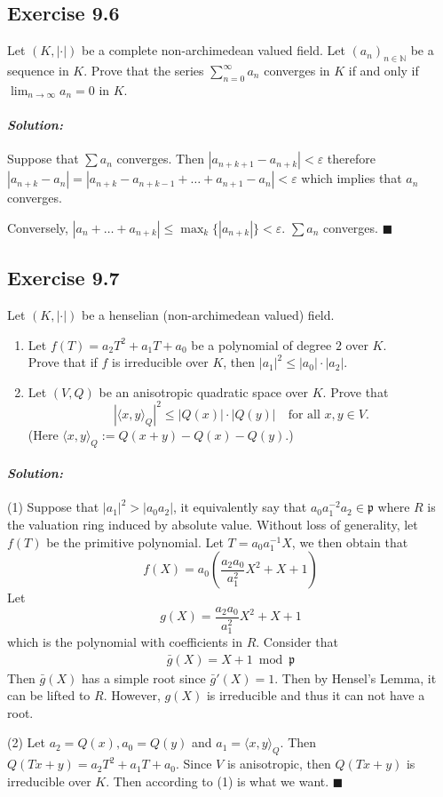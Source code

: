 \documentclass[12pt, a4paper]{article}
\newcommand{\p}{\mathfrak{p}}
\newenvironment{solution}
  {\paragraph{\textit{Solution:}}\par\medskip}
  {\hfill$\blacksquare$\vspace{0.1cm}}
\begin{document}
\subsection*{Exercise 9.6}
Let $(K, |\cdot|)$ be a complete non-archimedean valued field. Let $(a_n)_{n \in \mathbb{N}}$ be a sequence in $K$. Prove that the series $\sum_{n=0}^\infty a_n$ converges in $K$ if and only if $\lim_{n \to \infty} a_n = 0$ in $K$.
\begin{solution}
    Suppose that $\sum a_n$ converges. Then $|a_{n+k+1}-a_{n+k}|<\varepsilon$ therefore $|a_{n+k}-a_n|=|a_{n+k}-a_{n+k-1}+\dots+a_{n+1}-a_n|<\varepsilon$ which implies that $a_n$ converges.

    Conversely, $|a_n+\dots+a_{n+k}|\le \max_{k}\{|a_{n+k}|\}<\varepsilon$. $\sum a_n$ converges.
\end{solution}


\subsection*{Exercise 9.7}
Let $(K, |\cdot|)$ be a henselian (non-archimedean valued) field.
\begin{enumerate}
    \item Let $f(T) = a_2T^2 + a_1T + a_0$ be a polynomial of degree $2$ over $K$.\\
    Prove that if $f$ is irreducible over $K$, then $|a_1|^2 \le |a_0| \cdot |a_2|$.
    \item Let $(V, Q)$ be an anisotropic quadratic space over $K$. Prove that
    \[ |\langle x, y \rangle_Q|^2 \le |Q(x)| \cdot |Q(y)| \quad \text{for all } x, y \in V. \]
    (Here $\langle x, y \rangle_Q := Q(x+y) - Q(x) - Q(y)$.)
\end{enumerate}
\begin{solution}
    (1) Suppose that $|a_1|^2>|a_0a_2|$, it equivalently say that $a_0a_1^{-2}a_2\in \p$ where $R$ is the valuation ring induced by absolute value.
    Without loss of generality, let $f(T)$ be the primitive polynomial. 
    Let $T = a_0a_1^{-1}X$, we then obtain that 
    $$f(X) = a_0 \left( \frac{a_2 a_0}{a_1^2} X^2 + X + 1 \right)$$
    Let $$g(X) =\frac{a_2 a_0}{a_1^2} X^2 + X + 1 $$
    which is the polynomial with coefficients in $R$. Consider that
    \begin{align*}
        \bar{g}(X) = X+1 \bmod \p
    \end{align*}
    Then $\bar{g}(X)$ has a simple root since $\bar{g}'(X)= 1$. Then by Hensel's Lemma, it can be lifted to $R$.
    However, $g(X)$ is irreducible and thus it can not have a root.

    (2) Let $a_2= Q(x),a_0=Q(y)$ and $a_1= \langle x, y \rangle_Q$. 
    Then $Q(Tx+y) = a_2T^2+a_1T+a_0$. Since $V$ is anisotropic, then $Q(Tx+y)$ is irreducible over $K$.
    Then according to (1) is what we want.
\end{solution}
\end{document}
